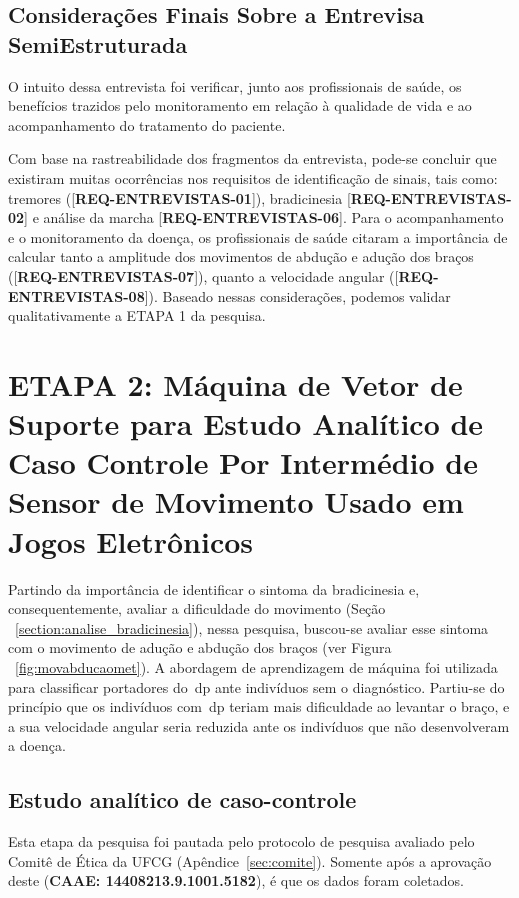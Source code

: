 \subsection{Considerações Finais Sobre a Entrevisa SemiEstruturada}
O intuito dessa entrevista foi verificar, junto aos profissionais de saúde, os benefícios trazidos pelo monitoramento em relação à qualidade de vida e ao acompanhamento do tratamento do paciente.

Com base na rastreabilidade dos fragmentos da entrevista, pode-se concluir que existiram muitas ocorrências nos requisitos de identificação de sinais, tais como: tremores ([\textbf{REQ-ENTREVISTAS-01}]), bradicinesia [\textbf{REQ-ENTREVISTAS-02}] e análise da marcha [\textbf{REQ-ENTREVISTAS-06}]. Para o acompanhamento e o monitoramento da doença, os profissionais de saúde citaram a importância de calcular tanto a amplitude dos movimentos de abdução e adução dos braços ([\textbf{REQ-ENTREVISTAS-07}]), quanto a velocidade angular ([\textbf{REQ-ENTREVISTAS-08}]). Baseado nessas considerações, podemos validar qualitativamente a ETAPA 1 da pesquisa.


\section{ETAPA 2: Máquina de Vetor de Suporte para Estudo Analítico de Caso Controle Por Intermédio de Sensor de Movimento Usado em Jogos Eletrônicos}\label{sec:resultado_svm}

Partindo da importância de identificar o sintoma da bradicinesia e, consequentemente, avaliar a dificuldade do movimento (Seção ~\ref{section:analise_bradicinesia}), nessa pesquisa, buscou-se avaliar esse sintoma com o movimento de adução e abdução dos braços (ver Figura ~\ref{fig:movabducaomet}). A abordagem de aprendizagem de máquina foi utilizada para classificar portadores do~\ac{dp} ante indivíduos sem o diagnóstico. Partiu-se do princípio que os indivíduos com~\ac{dp} teriam mais dificuldade ao levantar o braço, e a sua velocidade angular seria reduzida ante os indivíduos que não desenvolveram a doença.

\subsection{Estudo analítico de caso-controle}\label{section:estudo_caso_controle}
Esta etapa da pesquisa foi pautada pelo protocolo de pesquisa avaliado pelo Comitê de Ética da UFCG (Apêndice~\ref{sec:comite}). Somente após a aprovação deste (\textbf{CAAE: 14408213.9.1001.5182}), é que os dados foram coletados. 

